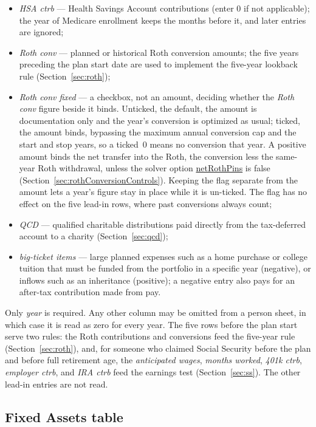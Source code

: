 \documentclass[fleqn,12pt]{report}
\newcommand{\code}[1]{\url{#1}}
\begin{document}
\begin{itemize}[nosep]
  \item \textit{HSA ctrb} --- Health Savings Account contributions (enter 0 if
    not applicable); the year of Medicare enrollment keeps the months before it,
    and later entries are ignored;
  \item \textit{Roth conv} --- planned or historical Roth conversion amounts;
    the five years preceding the plan start date are used to implement the
    five-year lookback rule (Section~\ref{sec:roth});
  \item \textit{Roth conv fixed} --- a checkbox, not an amount, deciding whether
    the \textit{Roth conv} figure beside it binds.  Unticked, the default, the
    amount is documentation only and the year's conversion is optimized as usual;
    ticked, the amount binds, bypassing the maximum annual conversion cap and the
    start and stop years, so a ticked~0 means no conversion that year.  A positive
    amount binds the net transfer into the Roth, the conversion less the same-year
    Roth withdrawal, unless the solver option \code{netRothPins} is false
    (Section~\ref{sec:rothConversionControls}).  Keeping the flag separate from
    the amount lets a year's figure stay in place while it is un-ticked.  The flag
    has no effect on the five lead-in rows, where past conversions always count;
  \item \textit{QCD} --- qualified charitable distributions paid directly from
    the tax-deferred account to a charity (Section~\ref{sec:qcd});
  \item \textit{big-ticket items} --- large planned expenses such as a home
    purchase or college tuition that must be funded from the portfolio in a
    specific year (negative), or inflows such as an inheritance (positive); a
    negative entry also pays for an after-tax contribution made from pay.
\end{itemize}

Only \textit{year} is required. Any other column may be omitted from a person
sheet, in which case it is read as zero for every year.
The five rows before the plan start serve two rules: the Roth contributions and
conversions feed the five-year rule (Section~\ref{sec:roth}), and, for someone who
claimed Social Security before the plan and before full retirement age, the
\textit{anticipated wages}, \textit{months worked}, \textit{401k ctrb},
\textit{employer ctrb}, and \textit{IRA ctrb} feed the earnings test
(Section~\ref{sec:ss}). The other lead-in entries are not read.

\subsection*{Fixed Assets table}
\end{document}

